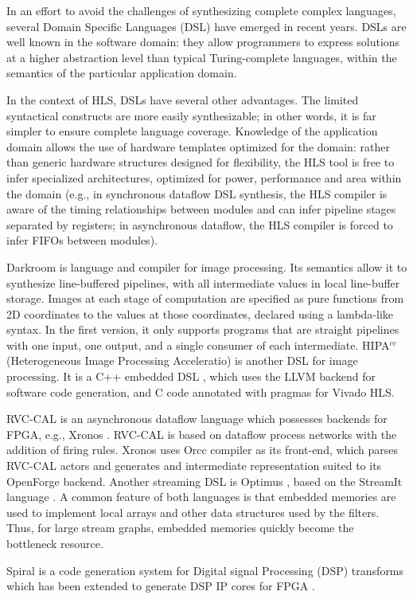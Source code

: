 In an effort to avoid the challenges of synthesizing complete complex languages, several Domain Specific Languages (DSL) have emerged in recent years. DSLs are well known in the software domain: they allow programmers to express solutions at a higher abstraction level than typical Turing-complete languages, within the semantics of the particular application domain.
\par In the context of HLS, DSLs have several other advantages. The limited syntactical constructs are more easily synthesizable; in other words, it is far simpler to ensure complete language coverage. Knowledge of the application domain allows the use of hardware templates optimized for the domain: rather than generic hardware structures designed for flexibility, the HLS tool is free to infer specialized architectures, optimized for power, performance and area within the domain (e.g., in synchronous dataflow DSL synthesis, the HLS compiler is aware of the timing relationships between modules and can infer pipeline stages separated by registers; in asynchronous dataflow, the HLS compiler is forced to infer FIFOs between modules).
\par Darkroom \cite{hegarty2014darkroom} is language and compiler for image processing. Its semantics allow it to synthesize line-buffered pipelines, with all intermediate values in local line-buffer storage. Images at each stage of computation are specified as pure functions from 2D coordinates to the values at those coordinates, declared using a lambda-like syntax. In the first version, it only supports programs that are straight pipelines with one input, one output, and a single consumer of each intermediate. HIPA$^{cc}$ \cite{7017495} (Heterogeneous Image Processing Acceleratio) is another DSL for image processing. It is a C++ embedded DSL \cite{cuadrado2007building}, which uses the LLVM backend \cite{lattner2004llvm} for software code generation, and C code annotated with pragmas for Vivado HLS.
\par RVC-CAL \cite{wipliez2011software} is an asynchronous dataflow language which possesses backends for FPGA, e.g., Xronos \cite{bezati2013high}. RVC-CAL is based on dataflow process networks with the addition of firing rules. Xronos uses Orcc compiler \cite{yviquel2013orcc} as its front-end, which parses RVC-CAL actors and generates and intermediate representation suited to its OpenForge backend. Another streaming DSL is Optimus \cite{hormati2008optimus}, based on the StreamIt language \cite{thies2002streamit}. A common feature of both languages is that embedded memories are used to implement local arrays and other data structures used by the filters. Thus, for large stream graphs, embedded memories quickly become the bottleneck resource.
\par Spiral \cite{puschel2005spiral} is a code generation system for Digital signal Processing (DSP) transforms which has been extended to generate DSP IP cores for FPGA \cite{d2007generating}.



